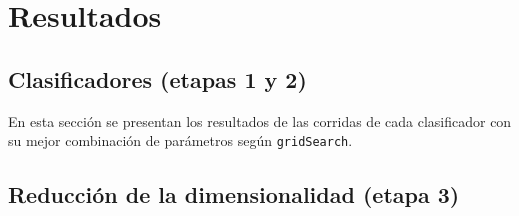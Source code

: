 \section{Resultados}

\subsection{Clasificadores (etapas 1 y 2)}

En esta sección se presentan los resultados de las corridas de cada clasificador con su mejor combinación de parámetros según \texttt{gridSearch}.




\subsection{Reducción de la dimensionalidad (etapa 3)}
